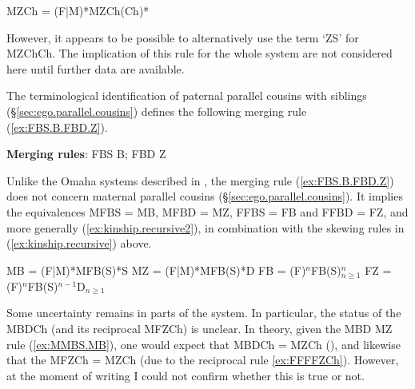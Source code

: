  \begin{exe}
\ex \label{ex:MMMMMZChChChCh}
\glt MZCh = (F|M)*MZCh(Ch)*
\end{exe}

However, it appears to be possible to alternatively use the term  `ZS' for MZChCh. The implication of this rule for the whole system are not considered here until further data are available.

The terminological identification of paternal parallel cousins with siblings (§\ref{sec:ego.parallel.cousins}) defines the following merging rule (\ref{ex:FBS.B.FBD.Z}).

\begin{exe}
\ex \label{ex:FBS.B.FBD.Z}
\glt \textbf{Merging rules}: FBS \fl{} B; FBD \fl{} Z
\end{exe}

Unlike the Omaha systems described in \citet[360]{lounsbury64crow}, the merging rule (\ref{ex:FBS.B.FBD.Z}) does not concern maternal parallel cousins (§\ref{sec:ego.parallel.cousins}). It implies the equivalences MFBS = MB, MFBD = MZ, FFBS = FB and FFBD = FZ, and more generally (\ref{ex:kinship.recursive2}), in combination with the skewing rules in (\ref{ex:kinship.recursive}) above.

 \begin{exe}
 \ex \label{ex:kinship.recursive2}
\begin{xlist}
\ex  
\glt MB = (F|M)*MFB(S)*S
\ex  
\glt MZ = (F|M)*MFB(S)*D
\ex  
\glt FB = (F)$^n$FB(S)$^n_{n\geqslant 1}$
\ex  
\glt FZ = (F)$^n$FB(S)$^{n-1}$D$_{n\geqslant 1}$
\end{xlist}
\end{exe}

Some uncertainty remains in parts of the system. In particular, the status of the MBDCh (and its reciprocal MFZCh) is unclear. In theory, given the MBD \fl{} MZ rule (\ref{ex:MMBS.MB}), one would expect that MBDCh = MZCh (), and likewise that the MFZCh = MZCh (due to the reciprocal rule \ref{ex:FFFFZCh}). However, at the moment of writing I could not confirm whether this is true or not.
 
% 
% 

